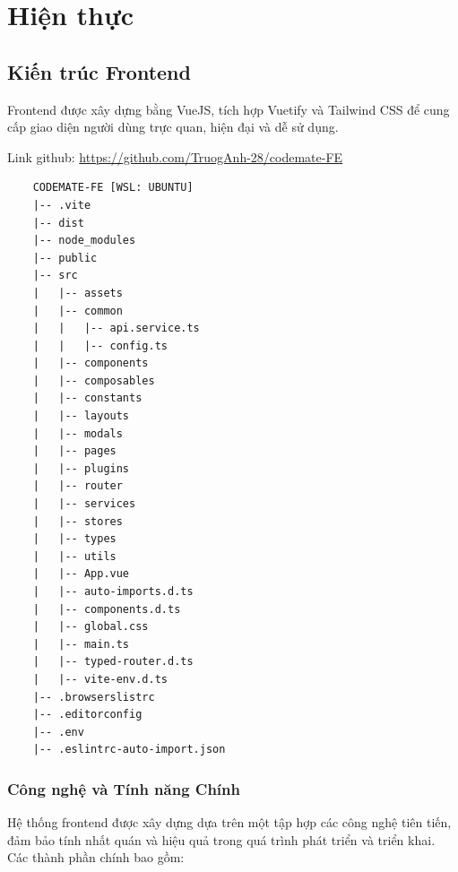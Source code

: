 \chapter{Hiện thực}

\section{Kiến trúc Frontend}

Frontend được xây dựng bằng VueJS, tích hợp Vuetify và Tailwind CSS để cung cấp giao diện người dùng trực quan, hiện đại và dễ sử dụng.

Link github: \href{https://github.com/TruogAnh-28/codemate-FE}{https://github.com/TruogAnh-28/codemate-FE}

\begin{verbatim}
    CODEMATE-FE [WSL: UBUNTU]
    |-- .vite
    |-- dist
    |-- node_modules
    |-- public
    |-- src
    |   |-- assets
    |   |-- common
    |   |   |-- api.service.ts
    |   |   |-- config.ts
    |   |-- components
    |   |-- composables
    |   |-- constants
    |   |-- layouts
    |   |-- modals
    |   |-- pages
    |   |-- plugins
    |   |-- router
    |   |-- services
    |   |-- stores
    |   |-- types
    |   |-- utils
    |   |-- App.vue
    |   |-- auto-imports.d.ts
    |   |-- components.d.ts
    |   |-- global.css
    |   |-- main.ts
    |   |-- typed-router.d.ts
    |   |-- vite-env.d.ts
    |-- .browserslistrc
    |-- .editorconfig
    |-- .env
    |-- .eslintrc-auto-import.json
    \end{verbatim}

\subsection*{Công nghệ và Tính năng Chính}

Hệ thống frontend được xây dựng dựa trên một tập hợp các công nghệ tiên tiến, đảm bảo tính nhất quán và hiệu quả trong quá trình phát triển và triển khai. Các thành phần chính bao gồm:


